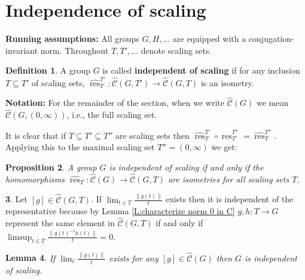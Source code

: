 \documentclass[12pt]{amsart}
\newtheorem{prop}{Proposition}[section]
\newtheorem{lemma}[prop]{Lemma}
\theoremstyle{definition}
\newtheorem{defn}[prop]{Definition}
\newtheorem{void}[prop]{}
\newtheorem*{notationx}{Notation}
\def\res{\operatorname{res}}
\def\tC{\hat{\mathcal{C}}}
\begin{document}
\section{Independence of scaling}
\label{section:indepence of scaling}

\noindent
{\bf Running assumptions:}
All groups $G,H,\dots$ are equipped with a conjugation-invariant norm.
Throughout $T,T',\dots$ denote scaling sets.



\begin{defn}\label{def:scaling independence}
A group $G$  is called {\bf independent of scaling} if for any inclusion $T \subseteq T'$ of scaling sets, $\widehat{\res}^{T'}_T \colon \tC(G,T') \to \tC(G,T)$ is an isometry.
\end{defn}


\medskip
\noindent
{\bf Notation:}
For the remainder of the section, when we write $\tC(G)$ we mean $\tC(G,(0,\infty))$, i.e., the full scaling set.


It is clear that if $T \subseteq T' \subseteq T''$ are scaling sets then $\widehat{\res}^{T'}_T\circ\widehat{\res}^{T''}_{T'} = \widehat{\res}^{T''}_T$.
Applying this to the maximal scaling set $T''=(0,\infty)$ we get: %

\begin{prop}\label{prop:scaling independence equivalent}
A group $G$ is independent of scaling if and only if the homomorphisms $\widehat{\res}_{T} \colon \tC(G) \to \tC(G,T)$ are isometries for all scaling sets $T$. %
\end{prop}



\begin{void}\label{paragraph:lim g(t)/t independent of representative}
Let $[g] \in \tC(G,T)$.
If $\lim_{t \in T} \tfrac{\|g(t)\|}{t}$ exists then it is independent of the representative because by Lemma \ref{L:characterize norm 0 in C} $g,h \colon T \to G$ represent the same element in $\tC(G,T)$ if and only if $\limsup_{t \in T} \tfrac{\|g(t)^{-1}h(t)\|}{t}=0$.
\end{void}





\begin{lemma}\label{L:lim exists => independence scaling}
If $\lim_t \tfrac{\|g(t)\|}{t}$ exists for any $[g] \in \tC(G)$ then $G$ is independent of scaling.
\end{lemma}
\end{document}
